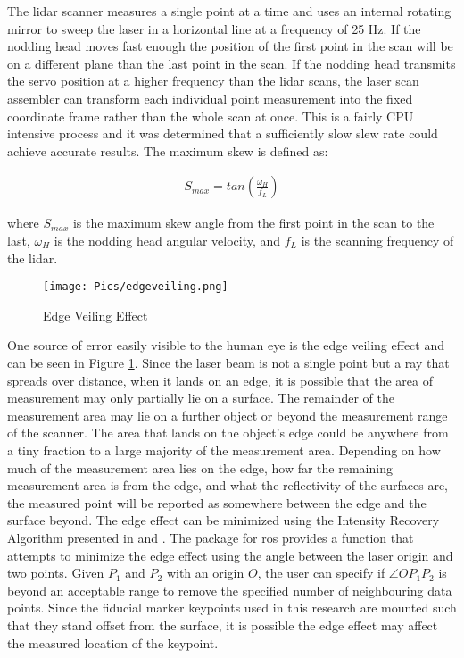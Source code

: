 The \acrshort{lidar} scanner measures a single point at a time and uses an internal rotating mirror to sweep the laser in a horizontal line at a frequency of 25 Hz. If the nodding head moves fast enough the position of the first point in the scan will be on a different plane than the last point in the scan. If the nodding head transmits the servo position at a higher frequency than the \acrshort{lidar} scans, the laser scan assembler can transform each individual point measurement into the fixed coordinate frame rather than the whole scan at once. This is a fairly CPU intensive process and it was determined that a sufficiently slow slew rate could achieve accurate results. The maximum skew is defined as:

\begin{align}
    S_{max} = tan\left(\frac{\omega_H}{f_L}\right)
\end{align}

where $S_{max}$ is the maximum skew angle from the first point in the scan to the last, $\omega_H$ is the nodding head angular velocity, and $f_L$ is the scanning frequency of the \acrshort{lidar}.\\

\begin{figure}
    \centering
    \texttt{[image: Pics/edgeveiling.png]}
    \caption{Edge Veiling Effect}
    \label{fig:veiling}
\end{figure}

One source of error easily visible to the human eye is the edge veiling effect and can be seen in Figure \ref{fig:veiling}. Since the laser beam is not a single point but a ray that spreads over distance, when it lands on an edge, it is possible that the area of measurement may only partially lie on a surface. The remainder of the measurement area may lie on a further object or beyond the measurement range of the scanner. The area that lands on the object's edge could be anywhere from a tiny fraction to a large majority of the measurement area. Depending on how much of the measurement area lies on the edge, how far the remaining measurement area is from the edge, and what the reflectivity of the surfaces are, the measured point will be reported as somewhere between the edge and the surface beyond. The edge effect can be minimized using the Intensity Recovery Algorithm presented in \cite{bookbaredge} and \cite{theotherone}. The  package for \acrshort{ros} provides a  function that attempts to minimize the edge effect using the angle between the laser origin and two points. Given $P_1$ and $P_2$ with an origin $O$, the user can specify if $\angle OP_1P_2$ is beyond an acceptable range to remove the specified number of neighbouring data points. Since the fiducial marker keypoints used in this research are mounted such that they stand offset from the surface, it is possible the edge effect may affect the measured location of the keypoint.\\

